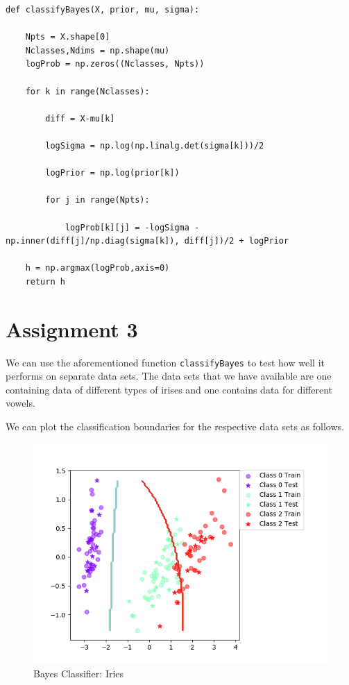 \documentclass{article}
\begin{document}
\begin{lstlisting}
def classifyBayes(X, prior, mu, sigma):

    Npts = X.shape[0]
    Nclasses,Ndims = np.shape(mu)
    logProb = np.zeros((Nclasses, Npts))
    
    for k in range(Nclasses):
        
        diff = X-mu[k]
        
        logSigma = np.log(np.linalg.det(sigma[k]))/2
        
        logPrior = np.log(prior[k])
        
        for j in range(Npts):
            
            logProb[k][j] = -logSigma - np.inner(diff[j]/np.diag(sigma[k]), diff[j])/2 + logPrior

    h = np.argmax(logProb,axis=0)
    return h
\end{lstlisting}

\section*{Assignment 3}

We can use the aforementioned function \texttt{classifyBayes} to test how well it performs on separate data sets. The data sets that we have available are one containing data of different types of irises and one contains data for different vowels. 

We can plot the classification boundaries for the respective data sets as follows.

\begin{figure}
    \centering
    \includegraphics[scale = 0.75]{BayesIris.png}
    \caption{Bayes Classifier: Iries}
\end{figure}
\end{document}
